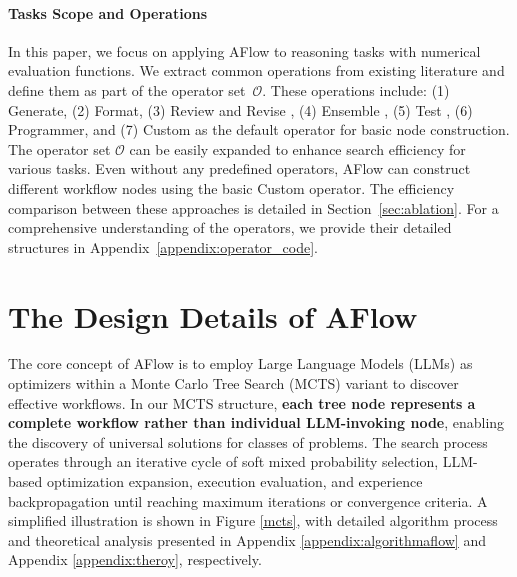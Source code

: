 \documentclass{article} %
\newcommand{\model}{{\sc AFlow}\xspace}
\theoremstyle{plain}
\theoremstyle{definition}
\theoremstyle{remark}
\begin{document}
\paragraph{Tasks Scope and Operations}

In this paper, we focus on applying \model to reasoning tasks with numerical evaluation functions. We extract common operations from existing literature and define them as part of the operator set~$\mathcal{O}$.
These operations include:
(1) Generate, (2) Format, (3) Review and Revise \cite{madaan2023self},
(4) Ensemble \cite{wang2022COTSC},
(5) Test \cite{li2024debug}, (6) Programmer, and (7) Custom as the default operator for basic node construction. The operator set $\mathcal{O}$ can be easily expanded to enhance search efficiency for various tasks. Even without any predefined operators, \model can construct different workflow nodes using the basic Custom operator. The efficiency comparison between these approaches is detailed in Section~\ref{sec:ablation}. For a comprehensive understanding of the operators, we provide their detailed structures in Appendix~\ref{appendix:operator_code}.

\section{The Design Details of \model} 
The core concept of \model is to employ Large Language Models (LLMs) as optimizers within a Monte Carlo Tree Search (MCTS) variant to discover effective workflows. In our MCTS structure, \textbf{each tree node represents a complete workflow rather than individual LLM-invoking node}, enabling the discovery of universal solutions for classes of problems. The search process operates through an iterative cycle of soft mixed probability selection, LLM-based optimization expansion, execution evaluation, and experience backpropagation until reaching maximum iterations or convergence criteria. A simplified illustration is shown in Figure \ref{mcts}, with detailed algorithm process and theoretical analysis presented in Appendix \ref{appendix:algorithmaflow} and Appendix \ref{appendix:theroy}, respectively.
\end{document}
